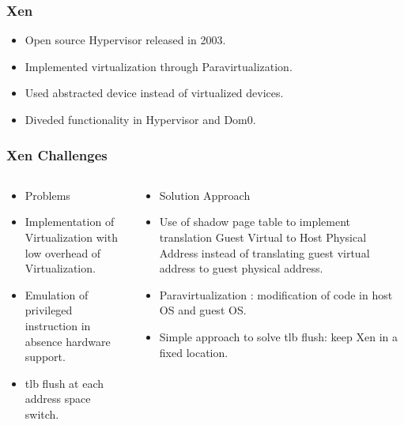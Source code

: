 \documentclass{beamer}
\begin{document}
\begin{frame} 
\frametitle{Xen}
\begin{itemize}
\item Open source Hypervisor released in 2003. 
\item Implemented virtualization through Paravirtualization.
\item Used abstracted device instead of virtualized devices.
\item Diveded functionality in Hypervisor and Dom0.
\end{itemize}
\end{frame}

\begin{frame} 
\frametitle{Xen Challenges}
\begin{columns}
\begin{column}{0.5\textwidth}
\begin{itemize}
\item Problems
\item Implementation of Virtualization with low overhead of Virtualization.
\item Emulation of privileged instruction in absence hardware support.
\item tlb flush at each address space switch.
\end{itemize}
\end{column}
\begin{column}{0.5\textwidth}
\begin{itemize}
 \item Solution Approach
 \item Use of shadow page table to implement translation 
 Guest Virtual to Host Physical Address instead of translating guest virtual address to guest physical address\cite{xen}.
 \item Paravirtualization : modification of code in host OS and guest OS.\cite{xen}
 \item Simple approach to solve tlb flush: keep Xen in a fixed location.
\end{itemize}
\end{column}
\end{columns}
\end{frame}
\end{document}
